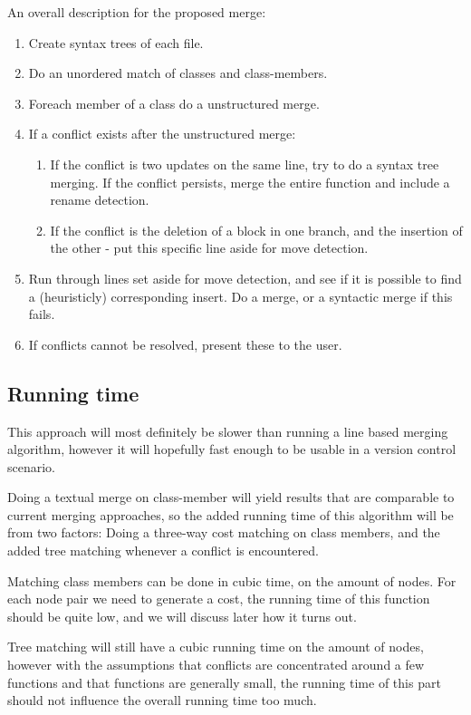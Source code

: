 \documentclass[11pt]{article}
\begin{document}
An overall description for the proposed merge:

\begin{enumerate}
	\item Create syntax trees of each file.
	\item Do an unordered match of classes and class-members.
	\item Foreach member of a class do a unstructured merge.
	\item If a conflict exists after the unstructured merge:
	\begin{enumerate}
		\item If the conflict is two updates on the same line, try to do a syntax tree merging. If the conflict persists, merge the entire function and include a rename detection.
		\item If the conflict is the deletion of a block in one branch, and the insertion of the other - put this specific line aside for move detection.
	\end{enumerate}
	\item Run through lines set aside for move detection, and see if it is possible to find a (heuristicly) corresponding insert. Do a merge, or a syntactic merge if this fails.
	\item If conflicts cannot be resolved, present these to the user.
\end{enumerate}

\subsection{Running time}
This approach will most definitely be slower than running a line based merging algorithm, however it will hopefully fast enough to be usable in a version control scenario.

Doing a textual merge on class-member will yield results that are comparable to current merging approaches, so the added running time of this algorithm will be from two factors: Doing a three-way cost matching on class members, and the added tree matching whenever a conflict is encountered.

Matching class members can be done in cubic time, on the amount of nodes. For each node pair we need to generate a cost, the running time of this function should be quite low, and we will discuss later how it turns out. 

Tree matching will still have a cubic running time on the amount of nodes, however with the assumptions that conflicts are concentrated around a few functions and that functions are generally small, the running time of this part should not influence the overall running time too much.
\end{document}

